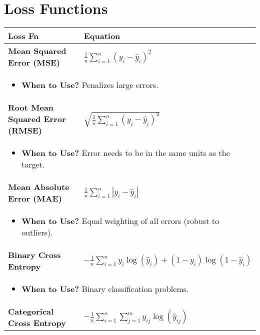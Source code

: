 \documentclass{article}
\begin{document}
\section{Loss Functions}
\begin{summary}
    \begin{center}
        \begin{tabular}{ll}
            \toprule
            \textbf{Loss Fn} & \textbf{Equation} \\ 
            \toprule
            \textbf{Mean Squared Error (MSE)} & $\frac{1}{n} \sum_{i=1}^{n} (y_i - \hat{y}_i)^2$ \\
            \multicolumn{2}{p{\linewidth}}{
            \begin{itemize}
                \item \textbf{When to Use?} Penalizes large errors.
            \end{itemize}} \\
            \midrule
            \textbf{Root Mean Squared Error (RMSE)} & $\sqrt{\frac{1}{n} \sum_{i=1}^{n} (y_i - \hat{y}_i)^2}$ \\
            \multicolumn{2}{p{\linewidth}}{
            \begin{itemize}
                \item \textbf{When to Use?} Error needs to be in the same units as the target.
            \end{itemize}} \\
            \midrule
            \textbf{Mean Absolute Error (MAE)} & $\frac{1}{n} \sum_{i=1}^{n} |y_i - \hat{y}_i|$ \\
            \multicolumn{2}{p{\linewidth}}{
            \begin{itemize}
                \item \textbf{When to Use?} Equal weighting of all errors (robust to outliers).
            \end{itemize}} \\
            \midrule
            \textbf{Binary Cross Entropy} & $- \frac{1}{n} \sum_{i=1}^{n} y_i \log(\hat{y}_i) + (1 - y_i) \log(1 - \hat{y}_i)$ \\
            \multicolumn{2}{p{\linewidth}}{
            \begin{itemize}
                \item \textbf{When to Use?} Binary classification problems.
            \end{itemize}} \\
            \midrule
            \textbf{Categorical Cross Entropy} & $- \frac{1}{n} \sum_{i=1}^{n} \sum_{j=1}^{m} y_{ij} \log(\hat{y}_{ij})$ \\

\end{tabular}
\end{center}
\end{summary}
\end{document}
